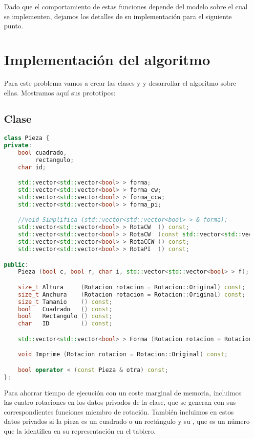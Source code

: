 Dado que el comportamiento de estas funciones depende del modelo sobre el cual se implementen, dejamos los detalles de su implementación para el siguiente punto.

\section{Implementación del algoritmo}\label{grafos-implementacion}

Para este problema vamos a crear las clases  y  y desarrollar el algoritmo sobre ellas.
Mostramos aquí sus prototipos:

\subsection{Clase }\label{grafos-implementacion-pieza}

\begin{lstlisting}[language=C++]
class Pieza {
private:
	bool cuadrado,
	     rectangulo;
	char id;

	std::vector<std::vector<bool> > forma;
	std::vector<std::vector<bool> > forma_cw;
	std::vector<std::vector<bool> > forma_ccw;
	std::vector<std::vector<bool> > forma_pi;

	//void Simplifica (std::vector<std::vector<bool> > & forma);
	std::vector<std::vector<bool> > RotaCW  () const;
	std::vector<std::vector<bool> > RotaCW  (const std::vector<std::vector<bool> > & rotable) const;
	std::vector<std::vector<bool> > RotaCCW () const;
	std::vector<std::vector<bool> > RotaPI  () const;

public:
	Pieza (bool c, bool r, char i, std::vector<std::vector<bool> > f);

	size_t Altura     (Rotacion rotacion = Rotacion::Original) const;
	size_t Anchura    (Rotacion rotacion = Rotacion::Original) const;
	size_t Tamanio    () const;
	bool   Cuadrado   () const;
	bool   Rectangulo () const;
	char   ID         () const;

	std::vector<std::vector<bool> > Forma (Rotacion rotacion = Rotacion::Original) const;

	void Imprime (Rotacion rotacion = Rotacion::Original) const;

	bool operator < (const Pieza & otra) const;
};
\end{lstlisting}

Para ahorrar tiempo de ejecución con un coste marginal de memoria, incluimos las cuatro rotaciones en los datos privados de la clase, que se generan con sus correspondientes funciones miembro de rotación.
También incluimos en estos datos privados si la pieza es un cuadrado o un rectángulo y su , que es un número que la identifica en su representación en el tablero.

